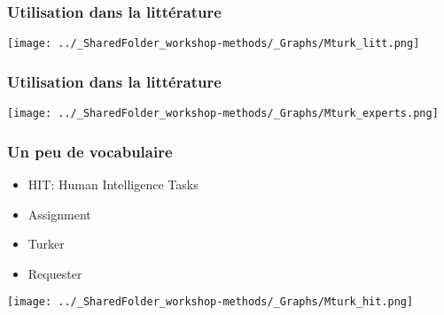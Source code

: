 \documentclass{beamer}
\begin{document}

    \begin{frame}
    
      \frametitle{Utilisation dans la littérature} \vspace{1cm}
      
       \begin{center}
         \texttt{[image: ../\_SharedFolder\_workshop-methods/\_Graphs/Mturk\_litt.png]}
        \end{center} 
   
         
    \end{frame}  
  
  

    \begin{frame}
    
      \frametitle{Utilisation dans la littérature} \vspace{1cm}
      
       \begin{center}
         \texttt{[image: ../\_SharedFolder\_workshop-methods/\_Graphs/Mturk\_experts.png]}
        \end{center} 
   
         
    \end{frame}  
    
    

    \begin{frame}
    
      \frametitle{Un peu de vocabulaire} \vspace{1cm}
      
       \begin{itemize}
          \item{HIT: Human Intelligence Tasks}
          \item{Assignment}
          \item{Turker}
          \item{Requester}
        \end{itemize}
   
   \begin{flushright}
     	    \texttt{[image: ../\_SharedFolder\_workshop-methods/\_Graphs/Mturk\_hit.png]}
    \end{flushright} 
         
    \end{frame}  
    
\end{document}
